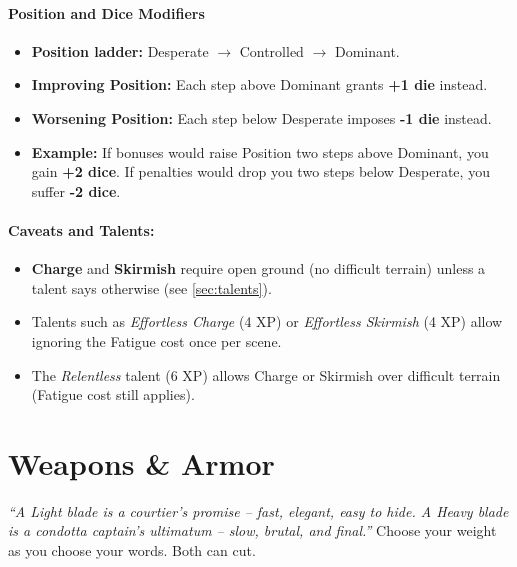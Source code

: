 \paragraph{Position and Dice Modifiers}
\label{sec:position-dice}
\begin{itemize}
  \item \textbf{Position ladder:} Desperate $\rightarrow$ Controlled $\rightarrow$ Dominant.
  \item \textbf{Improving Position:} Each step above Dominant grants \textbf{+1 die} instead.
  \item \textbf{Worsening Position:} Each step below Desperate imposes \textbf{-1 die} instead.
  \item \textbf{Example:} If bonuses would raise Position two steps above Dominant, you gain \textbf{+2 dice}. If penalties would drop you two steps below Desperate, you suffer \textbf{-2 dice}.
\end{itemize}

\paragraph{Caveats and Talents:}
\begin{itemize}
  \item \textbf{Charge} and \textbf{Skirmish} require open ground (no difficult terrain) unless a talent says otherwise (see \ref{sec:talents}).
  \item Talents such as \textit{Effortless Charge} (4 XP) or \textit{Effortless Skirmish} (4 XP) allow ignoring the Fatigue cost once per scene.
  \item The \textit{Relentless} talent (6 XP) allows Charge or Skirmish over difficult terrain (Fatigue cost still applies).
\end{itemize}

\section{Weapons \& Armor}
\label{sec:weapons-armor}

\begin{tcolorbox}[colback=green!5!white,colframe=green!70!black,title=Silkstrand Steel]
\emph{“A Light blade is a courtier’s promise – fast, elegant, easy to hide. A Heavy blade is a condotta captain’s ultimatum – slow, brutal, and final.”}  
Choose your weight as you choose your words. Both can cut.
\end{tcolorbox}


